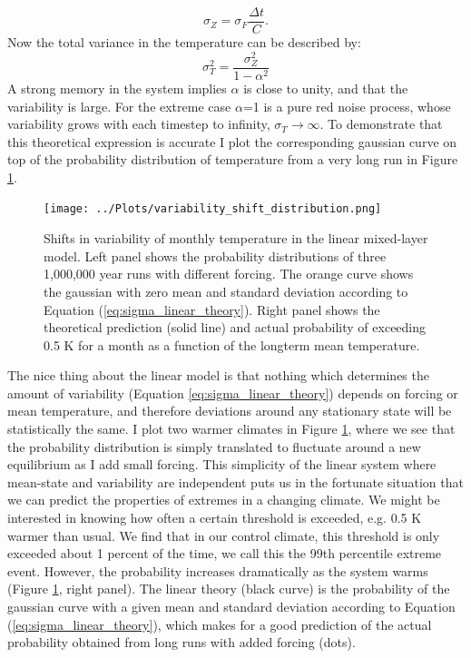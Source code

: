 \documentclass[12pt]{book}
\begin{document}
\begin{equation}
\sigma_Z = \sigma_F \frac{\Delta t}{C}.
\end{equation}
Now the total variance in the temperature can be described by:
\begin{equation}
	\sigma^{2}_T = \frac{\sigma^{2}_Z}{1 - \alpha^{2}}
	\label{eq:sigma_linear_theory}
\end{equation}
A strong memory in the system implies $\alpha$ is close to unity, and that the variability is large. For the extreme case $\alpha$=1  is a pure red noise process, whose variability grows with each timestep to infinity, $\sigma_T \rightarrow \infty$. To demonstrate that this theoretical expression is accurate I plot the corresponding gaussian curve on top of the probability distribution of temperature from a very long run in Figure \ref{fig:variability_shift_linear}. 
\\

\begin{figure}
	\begin{center}
		\texttt{[image: ../Plots/variability\_shift\_distribution.png]}
	\end{center}
	\caption{ Shifts in variability of monthly temperature in the linear mixed-layer model. Left panel shows the probability distributions of three 1,000,000 year runs with different forcing. The orange curve shows the gaussian with zero mean and standard deviation according to Equation (\ref{eq:sigma_linear_theory}). Right panel shows the theoretical prediction (solid line) and actual probability of exceeding 0.5 K for a month as a function of the longterm mean temperature.  } 
	\label{fig:variability_shift_linear}
\end{figure}


The nice thing about the linear model is that nothing which determines the amount of variability (Equation \ref{eq:sigma_linear_theory}) depends on forcing or mean temperature, and therefore deviations around any stationary state will be statistically the same. I plot two warmer climates in Figure \ref{fig:variability_shift_linear}, where we see that the probability distribution is simply translated to fluctuate around a new equilibrium as I add small forcing. 
This simplicity of the linear system where mean-state and variability are independent puts us in the fortunate situation that we can predict the properties of extremes in a changing climate. We might be interested in knowing how often a certain threshold is exceeded, e.g. 0.5 K warmer than usual. We find that in our control climate, this threshold is only exceeded about 1 percent of the time, we call this the 99th percentile extreme event. However, the probability increases dramatically as the system warms (Figure \ref{fig:variability_shift_linear}, right panel). The linear theory (black curve) is the probability of the gaussian curve with a given mean and standard deviation according to Equation (\ref{eq:sigma_linear_theory}), which makes for a good prediction of the actual probability obtained from long runs with added forcing (dots).
\end{document}
